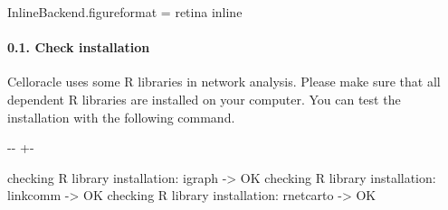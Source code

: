 \documentclass[letterpaper,10pt,english]{sphinxmanual}
\newlength\nbsphinxcodecellspacing
\begin{document}
{
\begin{sphinxVerbatim}[commandchars=\\\{\}]
\llap{\color{nbsphinxin}[3]:\,\hspace{\fboxrule}\hspace{\fboxsep}}
 InlineBackend.figure\PYGZus{}format = \PYGZsq{}retina\PYGZsq{}
 inline

\PYG{p}{[}\PYG{p}{]}  \PYG{p}{[} \PYG{p}{]}
\PYG{p}{[}\PYG{p}{]}  

\end{sphinxVerbatim}
}


\paragraph{0.1. Check installation}
\label{\detokenize{notebooks/04_Network_analysis/Network_analysis_with_with_Paul_etal_2015_data:0.1.-Check-installation}}
Celloracle uses some R libraries in network analysis. Please make sure that all dependent R libraries are installed on your computer. You can test the installation with the following command.

{
\begin{sphinxVerbatim}[commandchars=\\\{\}]
\llap{\color{nbsphinxin}[31]:\,\hspace{\fboxrule}\hspace{\fboxsep}}
\end{sphinxVerbatim}
}

{

\kern-\sphinxverbatimsmallskipamount\kern-\baselineskip
\kern+\FrameHeightAdjust\kern-\fboxrule
\vspace{\nbsphinxcodecellspacing}

\begin{sphinxVerbatim}[commandchars=\\\{\}]
checking R library installation: igraph -> OK
checking R library installation: linkcomm -> OK
checking R library installation: rnetcarto -> OK
\end{sphinxVerbatim}
}
\end{document}
